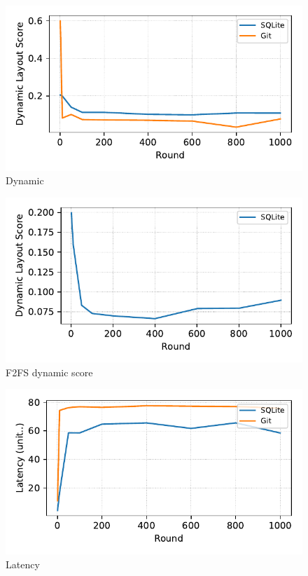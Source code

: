 
\begin{figure}[t]
    \centering
    \includegraphics[width=0.95\columnwidth]{graphs/py_graph/dynamic}
    \caption{Dynamic}
    \label{f:dynamic}
\end{figure}

\begin{figure}[t]
    \centering
    \includegraphics[width=0.95\columnwidth]{graphs/py_graph/dynamic-f2fs}
    \caption{F2FS dynamic score}
    \label{f:f2fs_dynamic_score}
\end{figure}


\begin{figure}[t]
    \centering
    \includegraphics[width=0.95\columnwidth]{graphs/py_graph/latency}
    \caption{Latency}
    \label{f:latency}
\end{figure}

